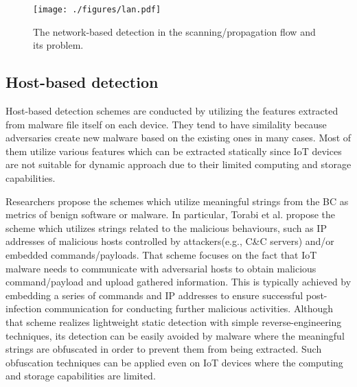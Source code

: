 \documentclass{ieeeaccess}
\begin{document}
\begin{figure}[t]
 \centering
 \texttt{[image: ./figures/lan.pdf]}
 \caption{The network-based detection in the scanning/propagation flow and its problem.} 
 \label{fig:lan}
\end{figure}

\subsection{Host-based detection}
Host-based detection schemes are conducted by utilizing the features extracted from malware file itself on each device.
They tend to have similality because adversaries create new malware based on the existing ones \cite{om, hwang, cfg, cfg2, op-graph, func-graph, api-graph} in many cases.
Most of them utilize various features which can be extracted statically since IoT devices are not suitable for dynamic approach due to their limited computing and storage capabilities.

Researchers \cite{om, hwang} propose the schemes which utilize meaningful strings from the BC as metrics of benign software or malware.
In particular, Torabi et al. \cite{om} propose the scheme which utilizes strings related to the malicious behaviours, such as IP addresses of malicious hosts controlled by attackers(e.g., C\&C servers) and/or embedded commands/payloads.
That scheme focuses on the fact that IoT malware needs to communicate with adversarial hosts to obtain malicious command/payload and upload gathered information.
This is typically achieved by embedding a series of commands and IP addresses to ensure successful post-infection communication for conducting further malicious activities. 
Although that scheme realizes lightweight static detection with simple reverse-engineering techniques, its detection can be easily avoided by malware where the meaningful strings are obfuscated in order to prevent them from being extracted.
Such obfuscation techniques can be applied even on IoT devices where the computing and storage capabilities are limited.

\end{document}
